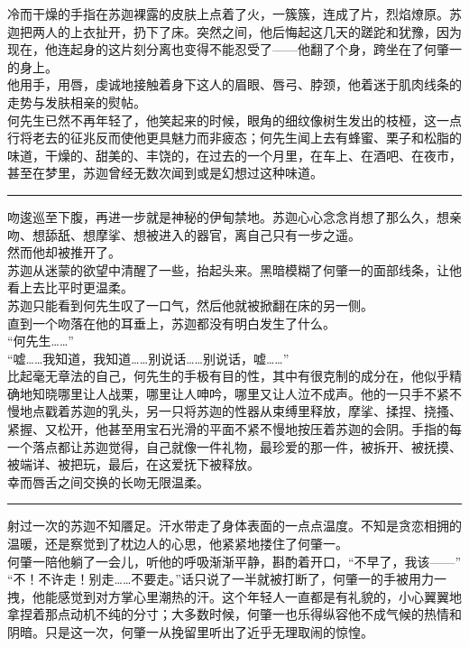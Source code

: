 \documentclass[oneside,11pt]{memoir} %
\begin{document}
\begin{CJK}{UTF8}{gbsn}
     冷而干燥的手指在苏迦裸露的皮肤上点着了火，一簇簇，连成了片，烈焰燎原。苏迦把两人的上衣扯开，扔下了床。突然之间，他后悔起这几天的蹉跎和犹豫，因为现在，他连起身的这片刻分离也变得不能忍受了——他翻了个身，跨坐在了何肇一的身上。\\\indent
     他用手，用唇，虔诚地接触着身下这人的眉眼、唇弓、脖颈，他着迷于肌肉线条的走势与发肤相亲的熨帖。\\\indent
     何先生已然不再年轻了，他笑起来的时候，眼角的细纹像树生发出的枝桠，这一点行将老去的征兆反而使他更具魅力而非疲态；何先生闻上去有蜂蜜、栗子和松脂的味道，干燥的、甜美的、丰饶的，在过去的一个月里，在车上、在酒吧、在夜市，甚至在梦里，苏迦曾经无数次闻到或是幻想过这种味道。\\\indent
\rule{-3pt}{30pt}
     吻逡巡至下腹，再进一步就是神秘的伊甸禁地。苏迦心心念念肖想了那么久，想亲吻、想舔舐、想摩挲、想被进入的器官，离自己只有一步之遥。\\\indent
     然而他却被推开了。\\\indent
     苏迦从迷蒙的欲望中清醒了一些，抬起头来。黑暗模糊了何肇一的面部线条，让他看上去比平时更温柔。\\\indent
     苏迦只能看到何先生叹了一口气，然后他就被掀翻在床的另一侧。\\\indent
     直到一个吻落在他的耳垂上，苏迦都没有明白发生了什么。\\\indent
     “何先生……”\\\indent
     “嘘……我知道，我知道……别说话……别说话，嘘……”\\\indent
     比起毫无章法的自己，何先生的手极有目的性，其中有很克制的成分在，他似乎精确地知晓哪里让人战栗，哪里让人呻吟，哪里又让人泣不成声。他的一只手不紧不慢地点戳着苏迦的乳头，另一只将苏迦的性器从束缚里释放，摩挲、揉捏、挠搔、紧握、又松开，他甚至用宝石光滑的平面不紧不慢地按压着苏迦的会阴。手指的每一个落点都让苏迦觉得，自己就像一件礼物，最珍爱的那一件，被拆开、被抚摸、被端详、被把玩，最后，在这爱抚下被释放。\\\indent
     幸而唇舌之间交换的长吻无限温柔。\\\indent
\rule{-3pt}{30pt}
     射过一次的苏迦不知餍足。汗水带走了身体表面的一点点温度。不知是贪恋相拥的温暖，还是察觉到了枕边人的心思，他紧紧地搂住了何肇一。\\\indent
     何肇一陪他躺了一会儿，听他的呼吸渐渐平静，斟酌着开口，“不早了，我该——”\\\indent
     “不！不许走！别走……不要走。”话只说了一半就被打断了，何肇一的手被用力一拽，他能感觉到对方掌心里潮热的汗。这个年轻人一直都是有礼貌的，小心翼翼地拿捏着那点动机不纯的分寸；大多数时候，何肇一也乐得纵容他不成气候的热情和阴暗。只是这一次，何肇一从挽留里听出了近乎无理取闹的惊惶。\\\indent

\end{CJK}
\end{document}
